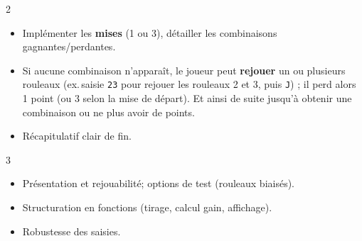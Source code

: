 \begin{UPSTICahierDesCharges}{2}
\begin{itemize}
  \item Implémenter les \textbf{mises} (1 ou 3), détailler les combinaisons gagnantes/perdantes.
  \item Si aucune combinaison n'apparaît, le joueur peut \textbf{rejouer} un ou plusieurs rouleaux (ex.\,saisie \texttt{23} pour rejouer les rouleaux 2 et 3, puis \texttt{J}) ; il perd alors 1 point (ou 3 selon la mise de départ). Et ainsi de suite jusqu'à obtenir une combinaison ou ne plus avoir de points.
  \item Récapitulatif clair de fin.
\end{itemize}
\end{UPSTICahierDesCharges}

\begin{UPSTICahierDesCharges}{3}
\begin{itemize}
  \item Présentation et rejouabilité; options de test (rouleaux biaisés).
  \item Structuration en fonctions (tirage, calcul gain, affichage).
  \item Robustesse des saisies.
\end{itemize}
\end{UPSTICahierDesCharges}

